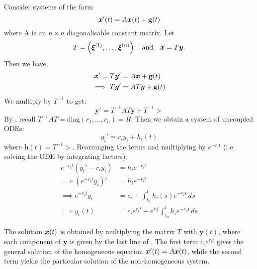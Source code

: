 Consider systems of the form
\begin{equation}
	\bm{x}'(t) = A \bm{x}(t) + \textbf{g}(t)
\end{equation} 
where A is an $n \times n$ diagonalisable constant matrix. Let
\[
T = \left(\bm{\xi} ^{(1)}, \ldots, \bm{\xi} ^{(n)}\right) \quad \text{and} \quad \bm{x} = T \bm{y}.
\]
Then we have,
\begin{align*}
	\bm{x}' = T \bm{y}' &= A \bm{x} + \textbf{g}(t) \\
	\implies T \bm{y}' &= A T \bm{y} + \textbf{g}(t)
\end{align*}
We multiply by $T^{-1}$ to get:
\begin{equation}\label{eq:diagdecoupled}
	\bm{y}' = T^{-1} A T \bm{y} + T^{-1} \gt
\end{equation}
By , recall $T^{-1} A T = \text{diag}(r_1,\ldots,r_n) = R$. Then we obtain a system of uncoupled ODEs:
\[
{y_i}' = r_i y_i + h_i(t)
\]
where $\bm{h}(t) = T^{-1} \gt$. Rearranging the terms and multiplying by $e^{-r_i t}$ (i.e. solving the ODE by integrating factors):
\begin{equation}\label{eq:diagsol}
	\begin{alignedat}{1}
		e^{-r_i t}(y_i' - r_i y_i) &= h_i e^{-r_i t} \\
		\implies (e^{-r_i t} y_i)' &= h_i e^{-r_i t} \\
		\implies e^{-r_i t} y_i &= c_i + \int^t_{t_0} h_i(s) e^{-r_i s} \,ds \\
		\implies y_i(t) &= c_i e^{r_i t} + e^{r_i t} \int^t_{t_0} h_i e^{-r_i s} \,ds
	\end{alignedat} 
\end{equation}

The solution $\bm{x}(t)$ is obtained by multiplying the matrix $T$ with $\bm{y}(t)$, where each component of $\bm{y}$ is given by the last line of . The first term $c_i e^{r_i t}$ gives the general solution of the homogeneous equation $\bm{x}'(t) = A\bm{x}(t)$, while the second term yields the particular solution of the non-homogeneous system.

